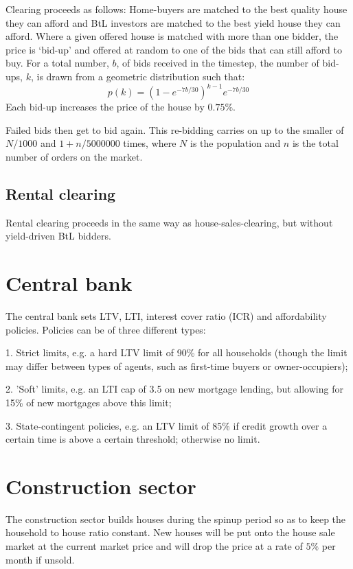 \documentclass{article}
\begin{document}
Clearing proceeds as follows: Home-buyers are matched to the best quality
house they can afford and BtL investors are matched to the best yield house
they can afford. Where a given offered house is matched with more than one
bidder, the price is `bid-up' and offered at random to one of the bids that
can still afford to buy. For a total number, $b$, of bids received in the timestep, the number of bid-ups, $k$, is drawn from a geometric distribution such that:
\[
p(k) = (1-e^{-7b/30})^{k-1}e^{-7b/30}
\]
Each bid-up increases the price of the house by $0.75\%$.

Failed bids then get to bid again. This re-bidding carries on up to the smaller of $N/1000$ and $1+n/5000000$ times, where $N$ is the population and $n$ is the total number of orders on the market.

\subsection{Rental clearing}

Rental clearing proceeds in the same way as house-sales-clearing, but
without yield-driven BtL bidders.\bigskip

\section{Central bank}

The central bank sets LTV, LTI, interest cover ratio (ICR) and affordability
policies. Policies can be of three different types:

1. Strict limits, e.g. a hard LTV limit of 90\% for all households (though
the limit may differ between types of agents, such as first-time buyers or
owner-occupiers);

2. 'Soft' limits, e.g. an LTI cap of 3.5 on new mortgage lending, but
allowing for 15\% of new mortgages above this limit;

3. State-contingent policies, e.g. an LTV limit of 85\% if credit growth
over a certain time is above a certain threshold; otherwise no limit.

\section{Construction sector}
The construction sector builds houses during the spinup period so as to keep the household to house ratio constant. New houses will be put onto the house sale market at the current market price and will drop the price at a rate of $5\%$ per month if unsold.
\end{document}
